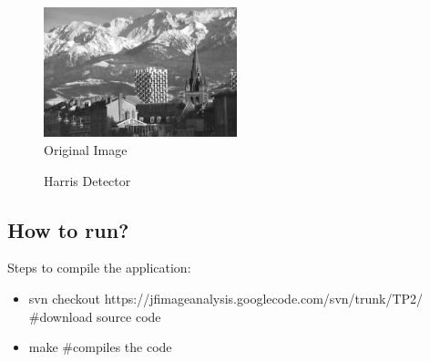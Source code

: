 \documentclass{article}
\begin{document}
	\begin{figure}[H]
	\centering
	\includegraphics[width=0.5\textwidth]{../img/grenoble}
	\caption{Original Image}
	\label{fig:harris}
	\end{figure}

	\begin{figure}[H]
	\centering
	\hspace{0.1cm}
	\hspace{0.1cm}
	\caption{Harris Detector}
	\end{figure}
	
	\subsection{How to run?}

	Steps to compile the application:
	
	\begin{itemize}
		\item svn checkout https://jfimageanalysis.googlecode.com/svn/trunk/TP2/ \#download source code
		\item make \#compiles the code
	\end{itemize}
\end{document}
